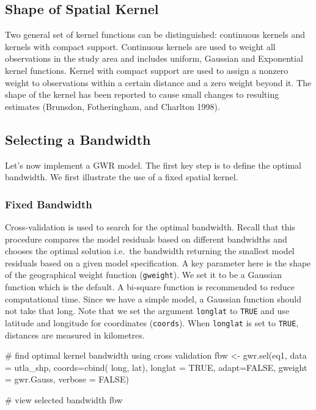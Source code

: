 \documentclass[
  letterpaper,
  DIV=11,
  numbers=noendperiod,
  oneside]{scrreprt}
\newenvironment{Shaded}{\begin{snugshade}}{\end{snugshade}}
\newcommand{\AttributeTok}[1]{\textcolor[rgb]{0.40,0.45,0.13}{#1}}
\newcommand{\CommentTok}[1]{\textcolor[rgb]{0.37,0.37,0.37}{#1}}
\newcommand{\ConstantTok}[1]{\textcolor[rgb]{0.56,0.35,0.01}{#1}}
\newcommand{\FunctionTok}[1]{\textcolor[rgb]{0.28,0.35,0.67}{#1}}
\newcommand{\NormalTok}[1]{\textcolor[rgb]{0.00,0.23,0.31}{#1}}
\newcommand{\OtherTok}[1]{\textcolor[rgb]{0.00,0.23,0.31}{#1}}
\begin{document}
\subsection{Shape of Spatial Kernel}\label{shape-of-spatial-kernel}

Two general set of kernel functions can be distinguished: continuous
kernels and kernels with compact support. Continuous kernels are used to
weight all observations in the study area and includes uniform, Gaussian
and Exponential kernel functions. Kernel with compact support are used
to assign a nonzero weight to observations within a certain distance and
a zero weight beyond it. The shape of the kernel has been reported to
cause small changes to resulting estimates (Brunsdon, Fotheringham, and
Charlton 1998).

\subsection{Selecting a Bandwidth}\label{selecting-a-bandwidth}

Let's now implement a GWR model. The first key step is to define the
optimal bandwidth. We first illustrate the use of a fixed spatial
kernel.

\subsubsection{Fixed Bandwidth}\label{fixed-bandwidth}

Cross-validation is used to search for the optimal bandwidth. Recall
that this procedure compares the model residuals based on different
bandwidths and chooses the optimal solution i.e.~the bandwidth returning
the smallest model residuals based on a given model specification. A key
parameter here is the shape of the geographical weight function
(\texttt{gweight}). We set it to be a Gaussian function which is the
default. A bi-square function is recommended to reduce computational
time. Since we have a simple model, a Gaussian function should not take
that long. Note that we set the argument \texttt{longlat} to
\texttt{TRUE} and use latitude and longitude for coordinates
(\texttt{coords}). When \texttt{longlat} is set to \texttt{TRUE},
distances are measured in kilometres.

\begin{Shaded}
\begin{Highlighting}[]
\CommentTok{\# find optimal kernel bandwidth using cross validation}
\NormalTok{fbw }\OtherTok{\textless{}{-}} \FunctionTok{gwr.sel}\NormalTok{(eq1, }
               \AttributeTok{data =}\NormalTok{ utla\_shp, }
               \AttributeTok{coords=}\FunctionTok{cbind}\NormalTok{( long, lat),}
               \AttributeTok{longlat =} \ConstantTok{TRUE}\NormalTok{,}
               \AttributeTok{adapt=}\ConstantTok{FALSE}\NormalTok{, }
               \AttributeTok{gweight =}\NormalTok{ gwr.Gauss, }
               \AttributeTok{verbose =} \ConstantTok{FALSE}\NormalTok{)}

\CommentTok{\# view selected bandwidth}
\NormalTok{fbw}
\end{Highlighting}
\end{Shaded}
\end{document}
